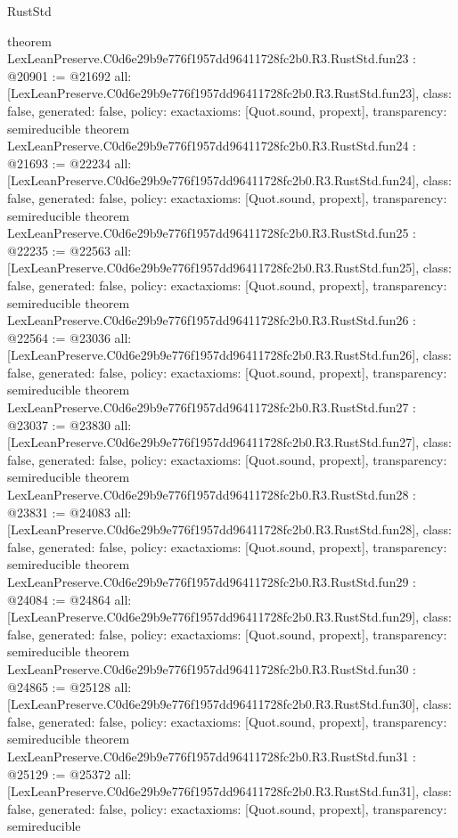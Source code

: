 \begin{lexlean}{RustStd}
\begin{coremodule}
{}
theorem LexLeanPreserve.C0d6e29b9e776f1957dd96411728fc2b0.R3.RustStd.fun23 : @20901 := @21692 {
  all: [LexLeanPreserve.C0d6e29b9e776f1957dd96411728fc2b0.R3.RustStd.fun23],
  class: false,
  generated: false,
  policy: exact{axioms: [Quot.sound, propext]},
  transparency: semireducible
}
theorem LexLeanPreserve.C0d6e29b9e776f1957dd96411728fc2b0.R3.RustStd.fun24 : @21693 := @22234 {
  all: [LexLeanPreserve.C0d6e29b9e776f1957dd96411728fc2b0.R3.RustStd.fun24],
  class: false,
  generated: false,
  policy: exact{axioms: [Quot.sound, propext]},
  transparency: semireducible
}
theorem LexLeanPreserve.C0d6e29b9e776f1957dd96411728fc2b0.R3.RustStd.fun25 : @22235 := @22563 {
  all: [LexLeanPreserve.C0d6e29b9e776f1957dd96411728fc2b0.R3.RustStd.fun25],
  class: false,
  generated: false,
  policy: exact{axioms: [Quot.sound, propext]},
  transparency: semireducible
}
theorem LexLeanPreserve.C0d6e29b9e776f1957dd96411728fc2b0.R3.RustStd.fun26 : @22564 := @23036 {
  all: [LexLeanPreserve.C0d6e29b9e776f1957dd96411728fc2b0.R3.RustStd.fun26],
  class: false,
  generated: false,
  policy: exact{axioms: [Quot.sound, propext]},
  transparency: semireducible
}
theorem LexLeanPreserve.C0d6e29b9e776f1957dd96411728fc2b0.R3.RustStd.fun27 : @23037 := @23830 {
  all: [LexLeanPreserve.C0d6e29b9e776f1957dd96411728fc2b0.R3.RustStd.fun27],
  class: false,
  generated: false,
  policy: exact{axioms: [Quot.sound, propext]},
  transparency: semireducible
}
theorem LexLeanPreserve.C0d6e29b9e776f1957dd96411728fc2b0.R3.RustStd.fun28 : @23831 := @24083 {
  all: [LexLeanPreserve.C0d6e29b9e776f1957dd96411728fc2b0.R3.RustStd.fun28],
  class: false,
  generated: false,
  policy: exact{axioms: [Quot.sound, propext]},
  transparency: semireducible
}
theorem LexLeanPreserve.C0d6e29b9e776f1957dd96411728fc2b0.R3.RustStd.fun29 : @24084 := @24864 {
  all: [LexLeanPreserve.C0d6e29b9e776f1957dd96411728fc2b0.R3.RustStd.fun29],
  class: false,
  generated: false,
  policy: exact{axioms: [Quot.sound, propext]},
  transparency: semireducible
}
theorem LexLeanPreserve.C0d6e29b9e776f1957dd96411728fc2b0.R3.RustStd.fun30 : @24865 := @25128 {
  all: [LexLeanPreserve.C0d6e29b9e776f1957dd96411728fc2b0.R3.RustStd.fun30],
  class: false,
  generated: false,
  policy: exact{axioms: [Quot.sound, propext]},
  transparency: semireducible
}
theorem LexLeanPreserve.C0d6e29b9e776f1957dd96411728fc2b0.R3.RustStd.fun31 : @25129 := @25372 {
  all: [LexLeanPreserve.C0d6e29b9e776f1957dd96411728fc2b0.R3.RustStd.fun31],
  class: false,
  generated: false,
  policy: exact{axioms: [Quot.sound, propext]},
  transparency: semireducible
}
\end{coremodule}
\end{lexlean}
